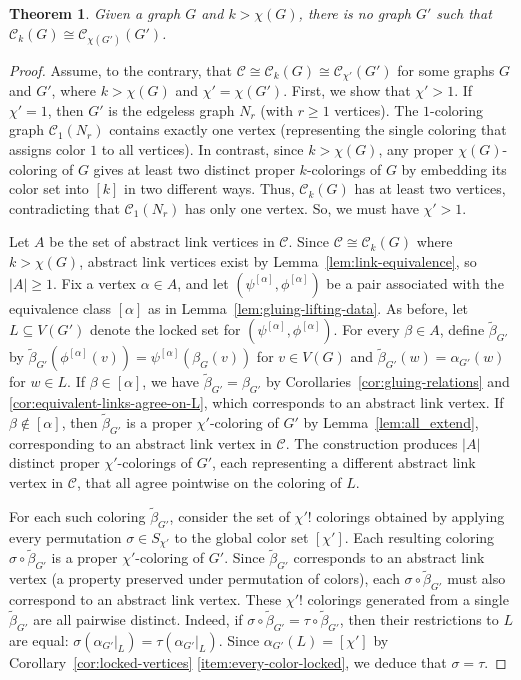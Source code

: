 \documentclass{amsart}
\theoremstyle{hypothesisstyle}
\newtheorem{theorem}{Theorem}[section]
\theoremstyle{definition}
\theoremstyle{remark}
\numberwithin{equation}{section}
\newcommand{\C}{\mathcal C}
\begin{document}
\begin{theorem}\label{thm:main}
    Given a graph $G$ and $k>\chi(G)$, there is no graph $G'$ such that $\C_k(G)\cong \C_{\chi(G')}(G')$.
\end{theorem}
\begin{proof}
    Assume, to the contrary, that $\C\cong \C_k(G)\cong\C_{\chi'}(G')$ for some graphs $G$ and $G'$, where $k>\chi(G)$ and $\chi'=\chi(G')$. First, we show that $\chi'>1$. If $\chi'=1$, then $G'$ is the edgeless graph $N_{r}$ (with $r\geq 1$ vertices). The $1$-coloring graph $\mathcal{C}_{1}(N_{r})$ contains exactly one vertex (representing the single coloring that assigns color $1$ to all vertices). In contrast, since $k>\chi(G)$, any proper $\chi(G)$-coloring of $G$ gives at least two distinct proper $k$-colorings of $G$ by embedding its color set into $[k]$ in two different ways. Thus, $\mathcal{C}_{k}(G)$ has at least two vertices, contradicting that $\mathcal{C}_{1}(N_{r})$ has only one vertex. So, we must have $\chi'>1$.
    
    Let $A$ be the set of abstract link vertices in $\mathcal{C}$. Since $\mathcal{C}\cong \mathcal{C}_{k}(G)$ where $k>\chi(G)$, abstract link vertices exist by Lemma~\ref{lem:link-equivalence}, so $|A|\geq 1$. Fix a vertex $\alpha\in A$, and let $(\psi^{[\alpha]},\phi^{[\alpha]})$ be a pair associated with the equivalence class $[\alpha]$ as in Lemma~\ref{lem:gluing-lifting-data}. As before, let $L\subseteq V(G')$ denote the locked set for $(\psi^{[\alpha]},\phi^{[\alpha]})$. For every $\beta\in A$, define $\widetilde{\beta}_{G'}$ by $
    \widetilde{\beta}_{G'}(\phi^{[\alpha]}(v))=\psi^{[\alpha]}(\beta_G(v))$ for $v\in V(G)$ and $\widetilde{\beta}_{G'}(w)=\alpha_{G'}(w)$ for $w\in L$. If $\beta\in [\alpha]$, we have $\widetilde{\beta}_{G'} = \beta_{G'}$ by Corollaries~\ref{cor:gluing-relations} and \ref{cor:equivalent-links-agree-on-L}, which corresponds to an abstract link vertex. If $\beta\notin [\alpha]$, then $\widetilde{\beta}_{G'}$ is a proper $\chi'$-coloring of $G'$ by Lemma~\ref{lem:all_extend}, corresponding to an abstract link vertex in $\C$. The construction produces $|A|$ distinct proper $\chi'$-colorings of $G'$, each representing a different abstract link vertex in $\mathcal{C}$, that all agree pointwise on the coloring of $L$.  
    
    For each such coloring $\widetilde{\beta}_{G'}$, consider the set of $\chi'!$ colorings obtained by applying every permutation $\sigma\in S_{\chi'}$ to the global color set $[\chi']$. Each resulting coloring $\sigma\circ \widetilde{\beta}_{G'}$ is a proper $\chi'$-coloring of $G'$. Since $\widetilde{\beta}_{G'}$ corresponds to an abstract link vertex (a property preserved under permutation of colors), each $\sigma\circ\widetilde{\beta}_{G'}$ must also correspond to an abstract link vertex. These $\chi'!$ colorings generated from a single $\widetilde{\beta}_{G'}$ are all pairwise distinct. Indeed, if $\sigma\circ \widetilde{\beta}_{G'}=\tau\circ \widetilde{\beta}_{G'}$, then their restrictions to $L$ are equal: $\sigma(\alpha_{G'}|_{L})=\tau(\alpha_{G'}|_{L})$. Since $\alpha_{G'}(L)=[\chi']$ by Corollary~\ref{cor:locked-vertices} \eqref{item:every-color-locked}, we deduce that $\sigma=\tau$.
    

\end{proof}
\end{document}
